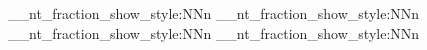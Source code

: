 \NewDocumentCommand \NTFractionShow { }
  {
    \__nt_fraction_show_style:NNn
      \displaystyle {}
    \__nt_fraction_show_style:NNn
      \textstyle {}
    \__nt_fraction_show_style:NNn
      \scriptstyle {}
    \__nt_fraction_show_style:NNn
      \scriptscriptstyle {}
  }

\ExplSyntaxOff

